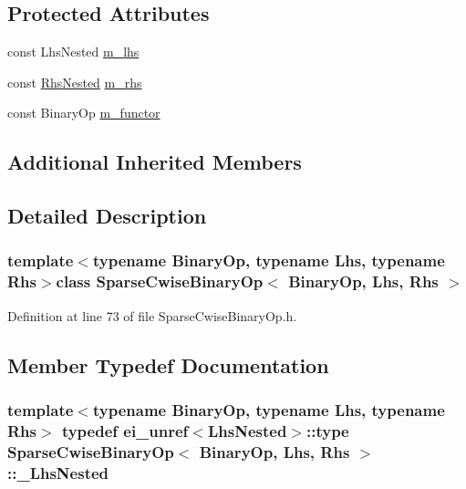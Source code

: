 \subsection*{Protected Attributes}
\begin{DoxyCompactItemize}
\item 
const Lhs\-Nested \hyperlink{class_sparse_cwise_binary_op_aad7278598734eddba46db178982a448a}{m\-\_\-lhs}
\item 
const \hyperlink{class_sparse_cwise_binary_op_ad4e1071aee8d4d88215fe279cf510d84}{Rhs\-Nested} \hyperlink{class_sparse_cwise_binary_op_ae9ed72be62625a1d5f27e7db2252b5f3}{m\-\_\-rhs}
\item 
const Binary\-Op \hyperlink{class_sparse_cwise_binary_op_a59fe533596b38cad5bbd2ea9a687c208}{m\-\_\-functor}
\end{DoxyCompactItemize}
\subsection*{Additional Inherited Members}


\subsection{Detailed Description}
\subsubsection*{template$<$typename Binary\-Op, typename Lhs, typename Rhs$>$class Sparse\-Cwise\-Binary\-Op$<$ Binary\-Op, Lhs, Rhs $>$}



Definition at line 73 of file Sparse\-Cwise\-Binary\-Op.\-h.



\subsection{Member Typedef Documentation}
\hypertarget{class_sparse_cwise_binary_op_a33b189ff88f95c7bfe920b8e9b0d42c6}{
\subsubsection[{\-\_\-\-Lhs\-Nested}]{\setlength{\rightskip}{0pt plus 5cm}template$<$typename Binary\-Op, typename Lhs, typename Rhs$>$ typedef {\bf ei\-\_\-unref}$<$Lhs\-Nested$>$\-::{\bf type} {\bf Sparse\-Cwise\-Binary\-Op}$<$ Binary\-Op, Lhs, Rhs $>$\-::{\bf \-\_\-\-Lhs\-Nested}}}\label{class_sparse_cwise_binary_op_a33b189ff88f95c7bfe920b8e9b0d42c6}



